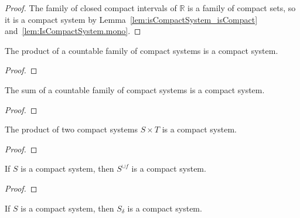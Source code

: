\begin{proof}\leanok
The family of closed compact intervals of $\mathbb{R}$ is a family of compact sets, so it is a compact system by Lemma~\ref{lem:isCompactSystem_isCompact} and~\ref{lem:IsCompactSystem.mono}.
\end{proof}


\begin{lemma}\label{lem:IsCompactSystem.pi}
The product of a countable family of compact systems is a compact system.
\end{lemma}

\begin{proof}

\end{proof}


\begin{lemma}\label{lem:IsCompactSystem.sigma}
  \leanok
The sum of a countable family of compact systems is a compact system.
\end{lemma}

\begin{proof}\leanok

\end{proof}


\begin{lemma}\label{lem:IsCompactSystem.image2_prod}
  \leanok
The product of two compact systems $S \times T$ is a compact system.
\end{lemma}

\begin{proof}

\end{proof}


\begin{lemma}\label{lem:IsCompactSystem.supClosure}
  \leanok
If $S$ is a compact system, then $S^{\cup f}$ is a compact system.
\end{lemma}

\begin{proof}

\end{proof}


\begin{lemma}\label{lem:IsCompactSystem.countableInfClosure}
If $S$ is a compact system, then $S_\delta$ is a compact system.
\end{lemma}

